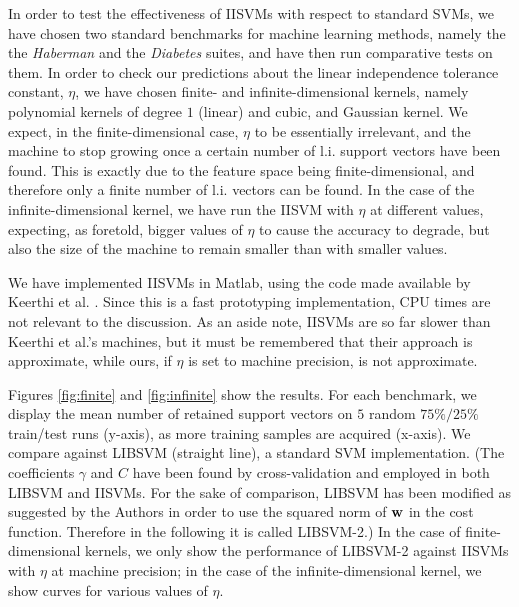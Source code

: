 In order to test the effectiveness of IISVMs with respect to standard
SVMs, we have chosen two standard benchmarks for machine learning
methods, namely the the \emph{Haberman} and the \emph{Diabetes}
suites, and have then run comparative tests on them. In order to check
our predictions about the linear independence tolerance constant,
$\eta$, we have chosen finite- and infinite-dimensional kernels,
namely polynomial kernels of degree $1$ (linear) and cubic, and
Gaussian kernel. We expect, in the finite-dimensional case, $\eta$ to
be essentially irrelevant, and the machine to stop growing once a
certain number of l.i. support vectors have been found. This is
exactly due to the feature space being finite-dimensional, and
therefore only a finite number of l.i. vectors can be found. In the
case of the infinite-dimensional kernel, we have run the IISVM with
$\eta$ at different values, expecting, as foretold, bigger values of
$\eta$ to cause the accuracy to degrade, but also the size of the
machine to remain smaller than with smaller values.

We have implemented IISVMs in Matlab, using the code made available by
Keerthi et al. \cite{KeerthiCDC06}. Since this is a fast prototyping
implementation, CPU times are not relevant to the discussion. As an
aside note, IISVMs are so far slower than Keerthi et al.'s machines,
but it must be remembered that their approach is approximate, while
ours, if $\eta$ is set to machine precision, is not approximate.

Figures \ref{fig:finite} and \ref{fig:infinite} show the results. For
each benchmark, we display the mean number of retained support vectors
on $5$ random $75\%/25\%$ train/test runs (y-axis), as more training
samples are acquired (x-axis). We compare against LIBSVM
\cite{ChangL01} (straight line), a standard SVM implementation. (The
coefficients $\gamma$ and $C$ have been found by cross-validation and
employed in both LIBSVM and IISVMs. For the sake of comparison, LIBSVM
has been modified as suggested by the Authors in order to use the
squared norm of $\mathbf{w}$ in the cost function. Therefore in the following
it is called LIBSVM-2.) In the case of finite-dimensional kernels, we
only show the performance of LIBSVM-2 against IISVMs with $\eta$ at
machine precision; in the case of the infinite-dimensional kernel, we
show curves for various values of $\eta$.

